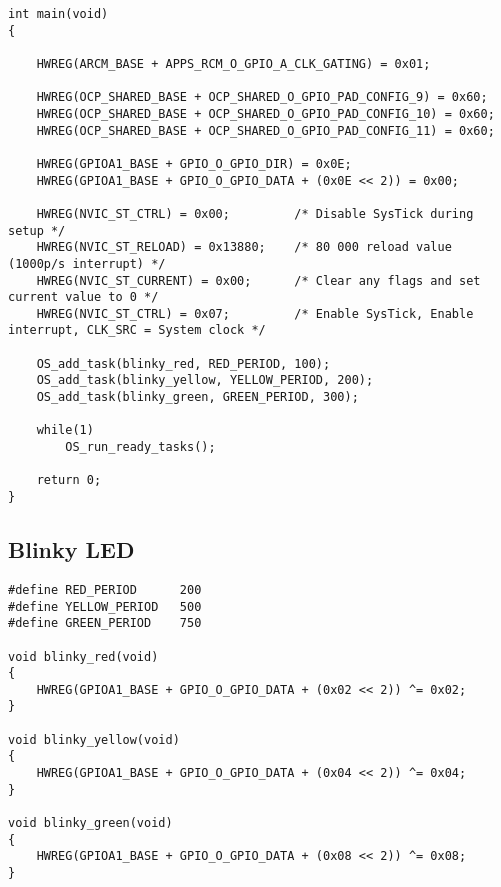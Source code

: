 \begin{lstlisting}[style=CStyle, caption={Scheduler using SysTick Main function}, captionpos=b, label={lst:scheduler_systick_main}, escapechar=@]
int main(void)
{

    HWREG(ARCM_BASE + APPS_RCM_O_GPIO_A_CLK_GATING) = 0x01;

    HWREG(OCP_SHARED_BASE + OCP_SHARED_O_GPIO_PAD_CONFIG_9) = 0x60;
    HWREG(OCP_SHARED_BASE + OCP_SHARED_O_GPIO_PAD_CONFIG_10) = 0x60;
    HWREG(OCP_SHARED_BASE + OCP_SHARED_O_GPIO_PAD_CONFIG_11) = 0x60;

    HWREG(GPIOA1_BASE + GPIO_O_GPIO_DIR) = 0x0E;
    HWREG(GPIOA1_BASE + GPIO_O_GPIO_DATA + (0x0E << 2)) = 0x00;

    HWREG(NVIC_ST_CTRL) = 0x00;         /* Disable SysTick during setup */
    HWREG(NVIC_ST_RELOAD) = 0x13880;    /* 80 000 reload value (1000p/s interrupt) */
    HWREG(NVIC_ST_CURRENT) = 0x00;      /* Clear any flags and set current value to 0 */
    HWREG(NVIC_ST_CTRL) = 0x07;         /* Enable SysTick, Enable interrupt, CLK_SRC = System clock */

    OS_add_task(blinky_red, RED_PERIOD, 100);
    OS_add_task(blinky_yellow, YELLOW_PERIOD, 200);
    OS_add_task(blinky_green, GREEN_PERIOD, 300);

    while(1)
        OS_run_ready_tasks();

    return 0;
}
\end{lstlisting}

\subsection{Blinky LED}
\begin{lstlisting}[style=CStyle, caption={Toggling LED tasks according to Table \ref{tab:led_schedule} }, captionpos=b, label={lst:led_tasks}, escapechar=@]
#define RED_PERIOD      200
#define YELLOW_PERIOD   500
#define GREEN_PERIOD    750

void blinky_red(void)
{
    HWREG(GPIOA1_BASE + GPIO_O_GPIO_DATA + (0x02 << 2)) ^= 0x02;
}

void blinky_yellow(void)
{
    HWREG(GPIOA1_BASE + GPIO_O_GPIO_DATA + (0x04 << 2)) ^= 0x04;
}

void blinky_green(void)
{
    HWREG(GPIOA1_BASE + GPIO_O_GPIO_DATA + (0x08 << 2)) ^= 0x08;
}
\end{lstlisting}


